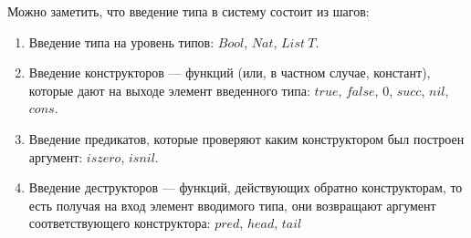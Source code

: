 \begin{itemize}
   \begin{prooftree}
   \end{prooftree}
   \begin{prooftree}
   \end{prooftree}
   \begin{prooftree}
   \end{prooftree}
   \begin{prooftree}
   \end{prooftree}
   \begin{prooftree}
   \end{prooftree}
   \begin{prooftree}
   \end{prooftree}
   \begin{prooftree}
   \end{prooftree}
   \begin{prooftree}
   \end{prooftree}
\end{itemize}

Можно заметить, что введение типа в систему состоит из шагов:
\begin{enumerate}
\item Введение типа на уровень типов: \(Bool\), \(Nat\), \(List\ T\).
\item Введение конструкторов --- функций (или, в частном
   случае, констант), которые дают на выходе элемент
   введенного типа: \(true\), \(false\), \(0\), \(succ\), \(nil\), \(cons\).
\item Введение предикатов, которые проверяют каким конструктором
   был построен аргумент: \(iszero\), \(isnil\).
\item Введение деструкторов --- функций, действующих обратно
   конструкторам, то есть получая на вход элемент вводимого типа,
   они возвращают аргумент соответствующего конструктора:
   \(pred\), \(head\), \(tail\)
\end{enumerate}

